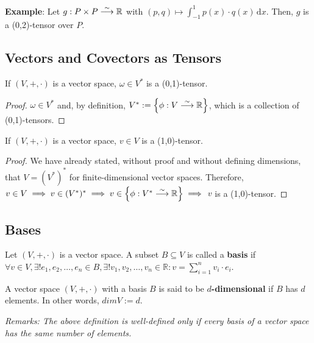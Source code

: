 \textbf{Example}: Let $g : P \times P \stackrel{\sim}{\longrightarrow} \mathbb{R}$ with $(p,q) \mapsto \int_{-1}^1 \! p(x) \cdot q(x) \, \mathrm{d}x$. Then, $g$ is a (0,2)-tensor over $P$.

\subsection{Vectors and Covectors as Tensors}
\begin{theorem}
If $(V,+,\cdot)$ is a vector space, $\omega \in V^\ast$ is a (0,1)-tensor.
\end{theorem}
\begin{proof}
$\omega \in V^\ast$ and, by definition, $V^{\ast} := \left\lbrace \phi : V \stackrel{\sim}{\longrightarrow} \mathbb{R} \right\rbrace$, which is a collection of (0,1)-tensors. 
\end{proof}

\begin{theorem}
If $(V,+,\cdot)$ is a vector space, $v \in V$ is a (1,0)-tensor.
\end{theorem}
\begin{proof}
We have already stated, without proof and without defining dimensions, that $V = (V^\ast)^\ast$ for finite-dimensional vector spaces. Therefore, $v \in V \implies v \in (V^\ast)^\ast \implies v \in \left\lbrace \phi : V^\ast \stackrel{\sim}{\longrightarrow} \mathbb{R} \right\rbrace \implies$ $v$ is a (1,0)-tensor.
\end{proof}

\subsection{Bases}
\begin{definition}
Let $(V,+,\cdot)$ is a vector space. A subset $B \subseteq V$ is called a \textbf{basis} if \\
$\forall v \in V, \exists ! e_1,e_2,\dotsc,e_n \in B, \exists ! v_1,v_2,\dotsc,v_n \in \mathbb{R} : v = \displaystyle\sum_{i=1}^n v_i \cdot e_i$. 
\end{definition}

\begin{definition}
A vector space $(V,+,\cdot)$ with a basis $B$ is said to be \textbf{$d$-dimensional} if $B$ has $d$ elements. In other words, $dim V := d$.
\end{definition}

\textit{Remarks: The above definition is well-defined only if every basis of a vector space has the same number of elements.}

